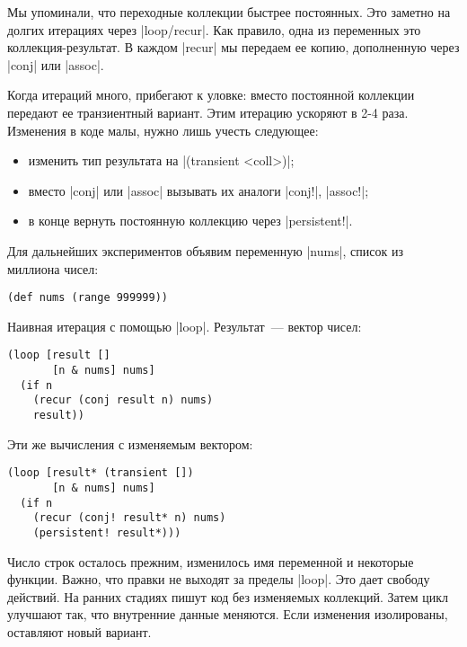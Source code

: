 Мы упоминали, что переходные коллекции быстрее постоянных. Это заметно на долгих
итерациях через \spverb|loop/recur|. Как правило, одна из переменных это
коллекция-результат. В каждом \spverb|recur| мы передаем ее копию, дополненную
через \spverb|conj| или \spverb|assoc|.

Когда итераций много, прибегают к уловке: вместо постоянной коллекции передают
ее транзиентный вариант. Этим итерацию ускоряют в 2-4 раза. Изменения в коде
малы, нужно лишь учесть следующее:

\begin{itemize}

\item
  изменить тип результата на \spverb|(transient <coll>)|;

\item
  вместо \spverb|conj| или \spverb|assoc| вызывать их аналоги \spverb|conj!|,
  \spverb|assoc!|;

\item
  в конце вернуть постоянную коллекцию через \spverb|persistent!|.

\end{itemize}

Для дальнейших экспериментов объявим переменную \spverb|nums|, список из
миллиона чисел:

\begin{verbatim}
(def nums (range 999999))
\end{verbatim}

Наивная итерация с помощью \spverb|loop|. Результат~--- вектор чисел:

\begin{verbatim}
(loop [result []
       [n & nums] nums]
  (if n
    (recur (conj result n) nums)
    result))
\end{verbatim}

Эти же вычисления с изменяемым вектором:

\begin{verbatim}
(loop [result* (transient [])
       [n & nums] nums]
  (if n
    (recur (conj! result* n) nums)
    (persistent! result*)))
\end{verbatim}

Число строк осталось прежним, изменилось имя переменной и некоторые
функции. Важно, что правки не выходят за пределы \spverb|loop|. Это дает свободу
действий. На ранних стадиях пишут код без изменяемых коллекций. Затем цикл
улучшают так, что внутренние данные меняются. Если изменения изолированы,
оставляют новый вариант.


